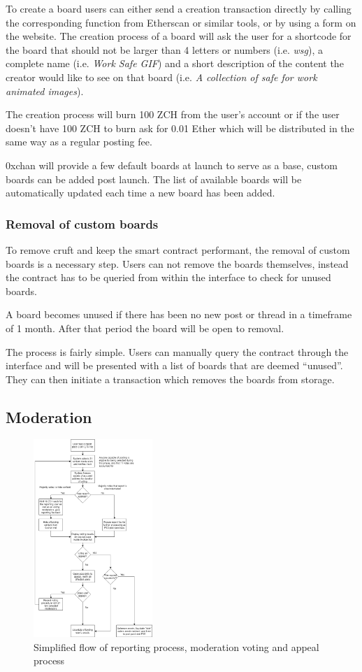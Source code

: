 \documentclass[a4paper]{article}
\newcommand{\projectname}{0xchan}
\begin{document}
To create a board users can either send a creation transaction directly by calling the corresponding function from Etherscan or similar tools, or by using a form on the website. The creation process of a board will ask the user for a shortcode for the board that should not be larger than 4 letters or numbers (i.e. \emph{wsg}), a complete name (i.e. \emph{Work Safe GIF}) and a short description of the content the creator would like to see on that board (i.e. \emph{A collection of safe for work animated images}).

The creation process will burn 100 ZCH from the user's account or if the user doesn't have 100 ZCH to burn ask for 0.01 Ether which will be distributed in the same way as a regular posting fee.

\projectname{} will provide a few default boards at launch to serve as a base, custom boards can be added post launch. The list of available boards will be automatically updated each time a new board has been added.

\subsubsection{Removal of custom boards}
To remove cruft and keep the smart contract performant, the removal of custom boards is a necessary step. Users can not remove the boards themselves, instead the contract has to be queried from within the interface to check for unused boards.

A board becomes unused if there has been no new post or thread in a timeframe of 1 month. After that period the board will be open to removal.

The process is fairly simple. Users can manually query the contract through the interface and will be presented with a list of boards that are deemed ``unused''. They can then initiate a transaction which removes the boards from storage.

\subsection{Moderation}
\begin{figure}
    \includegraphics[width=0.4\textwidth]{0x_moderation.png}
    \caption{Simplified flow of reporting process, moderation voting and appeal process}
    \label{fig:mod}
\end{figure}
\end{document}
